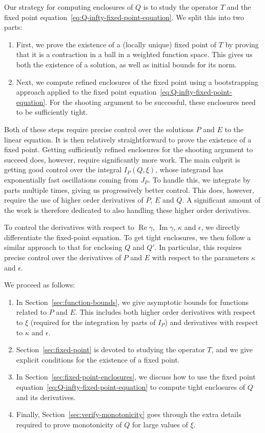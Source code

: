\documentclass[11pt]{article}
\DeclareMathOperator{\real}{Re}
\DeclareMathOperator{\imag}{Im}
\begin{document}
Our strategy for computing enclosures of \(Q\) is to study the
operator \(T\) and the fixed point
equation~\eqref{eq:Q-infty-fixed-point-equation}. We split this into
two parts:
\begin{enumerate}
\item First, we prove the existence of a (locally unique) fixed point
  of \(T\) by proving that it is a contraction in a ball in a weighted
  function space. This gives us both the existence of a solution, as
  well as initial bounds for its norm.
\item Next, we compute refined enclosures of the fixed point using a
  bootstrapping approach applied to the fixed point
  equation~\eqref{eq:Q-infty-fixed-point-equation}. For the shooting
  argument to be successful, these enclosures need to be sufficiently
  tight.
\end{enumerate}
Both of these steps require precise control over the solutions \(P\)
and \(E\) to the linear equation. It is then relatively
straightforward to prove the existence of a fixed point. Getting
sufficiently refined enclosures for the shooting argument to succeed
does, however, require significantly more work. The main culprit is
getting good control over the integral \(I_{P}(Q, \xi)\), whose
integrand has exponentially fast oscillations coming from \(J_{P}\).
To handle this, we integrate by parts multiple times, giving us
progressively better control. This does, however, require the use of
higher order derivatives of \(P\), \(E\) and \(Q\). A significant
amount of the work is therefore dedicated to also handling these
higher order derivatives.

To control the derivatives with respect to \(\real\gamma\),
\(\imag\gamma\), \(\kappa\) and \(\epsilon\), we directly
differentiate the fixed-point equation. To get tight enclosures, we
then follow a similar approach to that for enclosing \(Q\) and \(Q'\).
In particular, this requires precise control over the derivatives of
\(P\) and \(E\) with respect to the parameters \(\kappa\) and
\(\epsilon\).

We proceed as follows:
\begin{enumerate}
\item In Section~\ref{sec:function-bounds}, we give asymptotic bounds
  for functions related to \(P\) and \(E\). This includes both higher
  order derivatives with respect to \(\xi\) (required for the
  integration by parts of \(I_{P}\)) and derivatives with respect to
  \(\kappa\) and \(\epsilon\).
\item Section~\ref{sec:fixed-point} is devoted to studying the
  operator \(T\), and we give explicit conditions for the existence of
  a fixed point.
\item In Section~\ref{sec:fixed-point-enclosures}, we discuss how to
  use the fixed point equation~\eqref{eq:Q-infty-fixed-point-equation}
  to compute tight enclosures of \(Q\) and its derivatives.
\item Finally, Section~\ref{sec:verify-monotonicity} goes through the
  extra details required to prove monotonicity of \(Q\) for large
  values of \(\xi\).
\end{enumerate}
\end{document}
